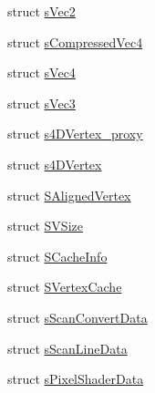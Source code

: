 \begin{DoxyCompactItemize}
\item 
struct \hyperlink{structirr_1_1video_1_1s_vec2}{s\-Vec2}
\item 
struct \hyperlink{structirr_1_1video_1_1s_compressed_vec4}{s\-Compressed\-Vec4}
\item 
struct \hyperlink{structirr_1_1video_1_1s_vec4}{s\-Vec4}
\item 
struct \hyperlink{structirr_1_1video_1_1s_vec3}{s\-Vec3}
\item 
struct \hyperlink{structirr_1_1video_1_1s4_d_vertex__proxy}{s4\-D\-Vertex\-\_\-proxy}
\item 
struct \hyperlink{structirr_1_1video_1_1s4_d_vertex}{s4\-D\-Vertex}
\item 
struct \hyperlink{structirr_1_1video_1_1_s_aligned_vertex}{S\-Aligned\-Vertex}
\item 
struct \hyperlink{structirr_1_1video_1_1_s_v_size}{S\-V\-Size}
\item 
struct \hyperlink{structirr_1_1video_1_1_s_cache_info}{S\-Cache\-Info}
\item 
struct \hyperlink{structirr_1_1video_1_1_s_vertex_cache}{S\-Vertex\-Cache}
\item 
struct \hyperlink{structirr_1_1video_1_1s_scan_convert_data}{s\-Scan\-Convert\-Data}
\item 
struct \hyperlink{structirr_1_1video_1_1s_scan_line_data}{s\-Scan\-Line\-Data}
\item 
struct \hyperlink{structirr_1_1video_1_1s_pixel_shader_data}{s\-Pixel\-Shader\-Data}
\end{DoxyCompactItemize}
